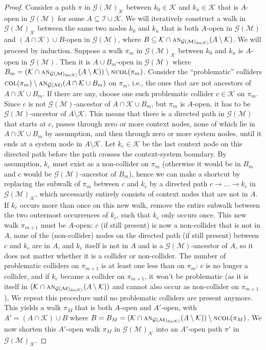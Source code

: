 \documentclass[twoside,11pt]{article}
\newcommand\C[1]{\mathcal{#1}}
\newcommand\mathbfsc[1]{\text{\normalfont\scshape#1}}
\newcommand\ncol[1]{\mathbfsc{ncol}(#1)}
\newcommand\col[1]{\mathbfsc{col}(#1)}
\newcommand\ansub[2]{\mathbfsc{an}_{#1}(#2)}
\newcommand{\intervene}{\mathrm{do}}
\begin{document}
\begin{proof}
Consider a path $\pi$ in $\C{G}(\C{M})_{\C{K}}$ between $k_0 \in \C{K}$ and $k_n \in \C{K}$
that is $A$-open in $\C{G}(\C{M})$ for some $A \subseteq \C{I} \cup \C{K}$. We will 
iteratively construct a walk in $\C{G}(\C{M})_{\C{K}}$ between the same two nodes $k_0$ and $k_n$ that is both
$A$-open in $\C{G}(\C{M})$ and $(A \cap \C{K}) \cup B$-open in $\C{G}(\C{M})$, where
$B \subseteq \C{K} \cap \ansub{\C{G}(\C{M})_{\intervene(\C{K})}}{A \setminus \C{K}}$.
We will proceed by induction. Suppose a walk $\pi_m$ in
$\C{G}(\C{M})_{\C{K}}$ between $k_0$ and $k_n$ is $A$-open in $\C{G}(\C{M})$. Then it is
$A \cup B_m$-open in $\C{G}(\C{M})$ where 
$B_m = (\C{K} \cap \ansub{\C{G}(\C{M})_{\intervene(\C{K})}}{A \setminus \C{K}}) \setminus \ncol{\pi_m}$.
Consider the ``problematic'' colliders $\col{\pi_m} \setminus \ansub{\C{G}(\C{M})}{A \cap \C{K} \cup B_m}$
on $\pi_m$, i.e., the ones that are not ancestors of $A \cap \C{K} \cup B_m$. If there
are any, choose one such problematic collider $c \in \C{K}$ on $\pi_m$. 
Since $c$ is not $\C{G}(\C{M})$-ancestor of $A \cap \C{K} \cup B_m$,
but $\pi_m$ is $A$-open, it has to be $\C{G}(\C{M})$-ancestor of $A \setminus \C{K}$.
This means that there is a directed path in $\C{G}(\C{M})$ that starts at
$c$, passes through zero or more context nodes, none of which lie in $A \cap \C{K} \cup B_m$ by assumption, and then 
through zero or more system nodes, until it ends at a system node in $A \setminus \C{K}$.
Let $k_c \in \C{K}$ be the last context node on this directed path before the path crosses
the context-system boundary. By assumption, 
$k_c$ must exist as a non-collider on $\pi_m$ (otherwise it would be in $B_m$ and $c$ would be
$\C{G}(\C{M})$-ancestor of $B_m$), hence we can make a shortcut
by replacing the subwalk of $\pi_m$ between $c$ and $k_c$ by a directed path 
$c \to \dots \to k_c$ in $\C{G}(\C{M})_{\C{K}}$, which 
necessarily entirely consists of context nodes that are not in $A$. 
If $k_c$ occurs more than once on this new walk, remove the entire subwalk between the
two outermost occurrences of $k_c$, such that $k_c$ only occurs once.
This new walk $\pi_{m+1}$ must be $A$-open: $c$ (if still present) is now a non-collider 
that is not in $A$, none of the (non-collider) nodes on the directed path (if still present)
between $c$ and $k_c$ are in $A$, and $k_c$ itself is not in $A$ and is a $\C{G}(\C{M})$-ancestor of $A$, 
so it does not matter whether it is a collider or non-collider. 
The number of problematic colliders on $\pi_{m+1}$ is at least one less than on $\pi_m$:
$c$ is no longer a collider, and if $k_c$ became a collider on $\pi_{m+1}$, it won't be problematic
(as it is itself in $(\C{K} \cap \ansub{\C{G}(\C{M})_{\intervene(\C{K})}}{A \setminus \C{K}})$
and cannot also occur as non-collider on $\pi_{m+1}$),
We repeat this procedure until no problematic colliders are present anymore. This yields a walk 
$\pi_M$ that is both $A$-open and $A'$-open, with $A' = (A \cap \C{K}) \cup B$ where
$B = B_M = (\C{K} \cap \ansub{\C{G}(\C{M})_{\intervene(\C{K})}}{A \setminus \C{K}}) \setminus \ncol{\pi_M}$.
We now shorten this $A'$-open walk $\pi_M$ in $\C{G}(\C{M})_{\C{K}}$ into an $A'$-open path $\pi'$ in $\C{G}(\C{M})_{\C{K}}$.


\end{proof}
\end{document}
